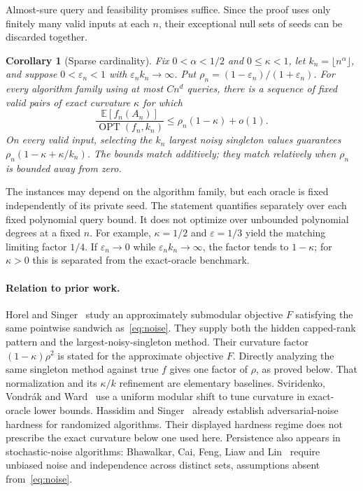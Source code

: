 \documentclass[manuscript,11pt,screen,nonacm]{acmart}
\newcommand{\E}{\mathbb E}
\newcommand{\OPT}{\operatorname{OPT}}
\newcommand{\eps}{\varepsilon}
\newtheorem{corollary}[theorem]{Corollary}
\begin{document}
Almost-sure query and feasibility promises suffice. Since the proof uses
only finitely many valid inputs at each $n$, their exceptional null sets
of seeds can be discarded together.

\begin{corollary}[Sparse cardinality]\label{cor:asymptotic}
Fix $0<\alpha<1/2$ and $0\le\kappa<1$, let
$k_n=\lfloor n^\alpha\rfloor$, and suppose $0<\eps_n<1$ with
$\eps_n k_n\to\infty$. Put $\rho_n=(1-\eps_n)/(1+\eps_n)$.
For every algorithm family using at most $C n^d$ queries, there is a sequence
of fixed valid pairs of exact curvature $\kappa$ for which
\begin{equation}\label{eq:asymptotic}
 \frac{\E[f_n(A_n)]}{\OPT(f_n,k_n)}
 \le \rho_n(1-\kappa)+o(1).
\end{equation}
On every valid input, selecting the $k_n$ largest noisy singleton values
guarantees $\rho_n(1-\kappa+\kappa/k_n)$.
The bounds match additively; they match relatively when $\rho_n$ is bounded
away from zero.
\end{corollary}

The instances may depend on the algorithm family, but each oracle is fixed
independently of its private seed. The statement quantifies separately over
each fixed polynomial query bound. It does not optimize over unbounded
polynomial degrees at a fixed $n$. For example, $\kappa=1/2$ and
$\eps=1/3$ yield the matching limiting factor $1/4$.
If $\eps_n\to0$ while $\eps_n k_n\to\infty$, the factor tends to
$1-\kappa$; for $\kappa>0$ this is separated from the exact-oracle benchmark.

\paragraph{Relation to prior work.}
Horel and Singer~\cite[Section 2.1 and Proposition 8]{HorelSinger16}
study an approximately submodular objective $F$ satisfying the same
pointwise sandwich as~\eqref{eq:noise}. They supply both the hidden
capped-rank pattern and the largest-noisy-singleton method. Their
curvature factor $(1-\kappa)\rho^2$ is stated for the approximate
objective $F$. Directly analyzing the same singleton method against
true $f$ gives one factor of $\rho$, as proved below. That normalization
and its $\kappa/k$ refinement are elementary baselines.
Sviridenko, Vondr\'ak and Ward~\cite[Section 7]{SVW14} use a uniform
modular shift to tune curvature in exact-oracle lower bounds.
Hassidim and Singer~\cite[Theorem 8 and Section 5]{HassidimSinger17}
already establish adversarial-noise hardness for randomized algorithms.
Their displayed hardness regime does not prescribe the exact curvature
below one used here. Persistence also appears in stochastic-noise
algorithms: Bhawalkar, Cai, Feng, Liaw and Lin~\cite[Section 2]{BCFLL25}
require unbiased noise and independence across distinct sets, assumptions
absent from~\eqref{eq:noise}.
\end{document}
